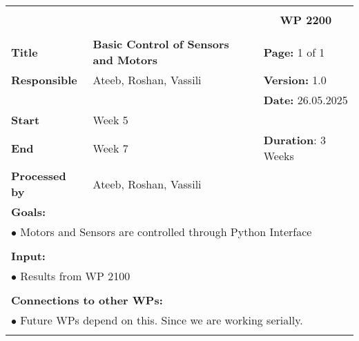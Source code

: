 \begin{table}[!h]
    \begin{center}
        \begin{tabular}{|p{}||p{}|p{}||p{}|}
            \hline
            \multicolumn{3}{|l||}{\textbf{}} & \multicolumn{1}{c|}{}\\
            \multicolumn{3}{|l||}{\textbf{}} & \multicolumn{1}{c|}{\textbf{WP 2200}}\\
            \multicolumn{3}{|l||}{\textbf{}} & \multicolumn{1}{c|}{}\\
            \hline\hline
            \textbf{Title} & \multicolumn{2}{p{.40\columnwidth}||}{\textbf{Basic Control of Sensors and Motors}}
            & \textbf{Page:} 1 of 1\\
            \hline
            \textbf{Responsible} & \multicolumn{2}{l||}{Ateeb, Roshan, Vassili} & \textbf{Version:} 1.0\\
            \hline
            \multicolumn{3}{|l||}{} & \textbf{Date:} 26.05.2025 \\
            \hline\hline
            \textbf{Start} & \multicolumn{2}{l||}{Week 5} & \\
            \hline
            \textbf{End} & \multicolumn{2}{l||}{Week 7} & \textbf{Duration}: 3 Weeks\\
            \hline\hline
            \textbf{Processed by} & \multicolumn{3}{l|}{Ateeb, Roshan, Vassili}\\
            \hline\hline
            \multicolumn{4}{|p{.95\columnwidth}|}{\textbf{Goals:}}\\
            \multicolumn{4}{|p{.95\columnwidth}|}{$\bullet$ Motors and Sensors are controlled through Python Interface}\\
            \multicolumn{4}{|p{.95\columnwidth}|}{}\\
            \multicolumn{4}{|p{.95\columnwidth}|}{\textbf{Input:}}\\
            \multicolumn{4}{|p{.95\columnwidth}|}{$\bullet$ Results from WP 2100}\\
            \multicolumn{4}{|p{.95\columnwidth}|}{}\\
            \multicolumn{4}{|p{.95\columnwidth}|}{\textbf{Connections to other WPs:}}\\
            \multicolumn{4}{|p{.95\columnwidth}|}{$\bullet$ Future WPs depend on this. Since we are working serially.}\\
            \multicolumn{4}{|p{.95\columnwidth}|}{}\\

\end{tabular}
\end{center}
\end{table}
